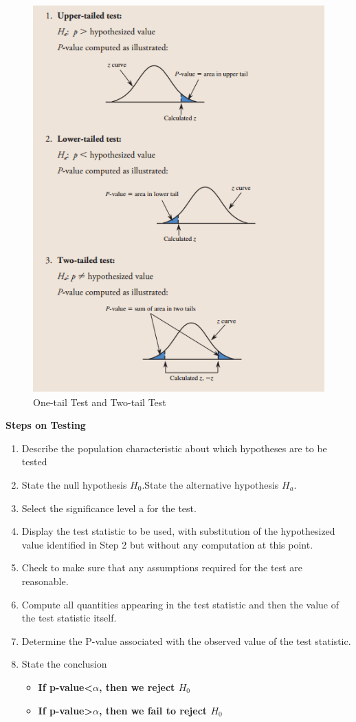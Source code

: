 \begin{figure}[H]
    \centering
    \includegraphics[width=125mm]{testhp.png}
    \caption{One-tail Test and Two-tail Test}
    \label{Figure 2}
\end{figure}

\textbf{Steps on Testing}
\begin{enumerate}
    \item Describe the population characteristic about which hypotheses are to be tested
    \item State the null hypothesis \(H_0\).State the alternative hypothesis \(H_a\).
    \item Select the significance level a for the test.
    \item Display the test statistic to be used, with substitution of the hypothesized
value identified in Step 2 but without any computation at this point.
    \item Check to make sure that any assumptions required for the test are reasonable.
    \item Compute all quantities appearing in the test statistic and then the value of
the test statistic itself.
    \item Determine the P-value associated with the observed value of the test statistic.
    \item State the conclusion 
    \begin{itemize}
    \item \textbf{If p-value<\(\alpha\), then we reject \(H_0\)}
    \item \textbf{If p-value>\(\alpha\), then we fail to reject \(H_0\)}
\end{itemize}
\end{enumerate}

